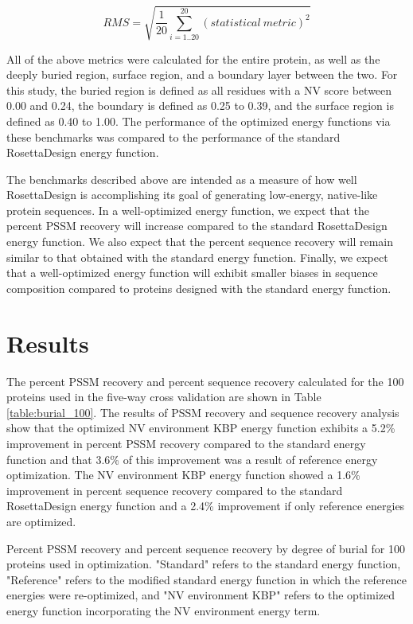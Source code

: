 \begin{equation}
RMS=\sqrt{\frac{1}{20}\sum^{20}_{i=1..20}(statistical\ metric)^{2}}
\end{equation}

All of the above metrics were calculated for the entire protein, as well as the deeply buried region, surface region, and a boundary layer between the two.
For this study, the buried region is defined as all residues with a \ac{NV} score between 0.00 and 0.24, the boundary is defined as 0.25 to 0.39, and the surface region is defined as 0.40 to 1.00.
The performance of the optimized energy functions via these benchmarks was compared to the performance of the standard RosettaDesign energy function.

The benchmarks described above are intended as a measure of how well RosettaDesign is accomplishing its goal of generating low-energy, native-like protein sequences.
In a well-optimized energy function, we expect that the percent \ac{PSSM} recovery will increase compared to the standard RosettaDesign energy function.
We also expect that the percent sequence recovery will remain similar to that obtained with the standard energy function.
Finally, we expect that a well-optimized energy function will exhibit smaller biases in sequence composition compared to proteins designed with the standard energy function.

\section{Results}

The percent \ac{PSSM} recovery and percent sequence recovery calculated for the 100 proteins used in the five-way cross validation are shown in Table \ref{table:burial_100}.
The results of \ac{PSSM} recovery and sequence recovery analysis show that the optimized \ac{NV} environment \ac{KBP} energy function exhibits a 5.2\% improvement in percent \ac{PSSM} recovery compared to the standard energy function and that 3.6\% of this improvement was a result of reference energy optimization.
The \ac{NV} environment \ac{KBP} energy function showed a 1.6\% improvement in percent sequence recovery compared to the standard RosettaDesign energy function and a 2.4\% improvement if only reference energies are optimized.  

\begin{table}
\scriptsize
\renewcommand{\tabcolsep}{0.09cm}
\centering

\caption{Percent \acs{PSSM} recovery and percent sequence recovery by degree of burial for 100 proteins used in optimization. "Standard" refers to the standard energy function, "Reference" refers to the modified standard energy function in which the reference energies were re-optimized, and "\acs{NV} environment \acs{KBP}" refers to the optimized energy function incorporating the \acs{NV} environment energy term.}
\label{table:burial_100}
\end{table}

